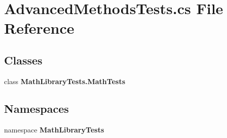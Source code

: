 \section{Advanced\+Methods\+Tests.\+cs File Reference}
\label{_advanced_methods_tests_8cs}
\subsection*{Classes}
\begin{DoxyCompactItemize}
\item 
class \textbf{ Math\+Library\+Tests.\+Math\+Tests}
\end{DoxyCompactItemize}
\subsection*{Namespaces}
\begin{DoxyCompactItemize}
\item 
namespace \textbf{ Math\+Library\+Tests}
\end{DoxyCompactItemize}
